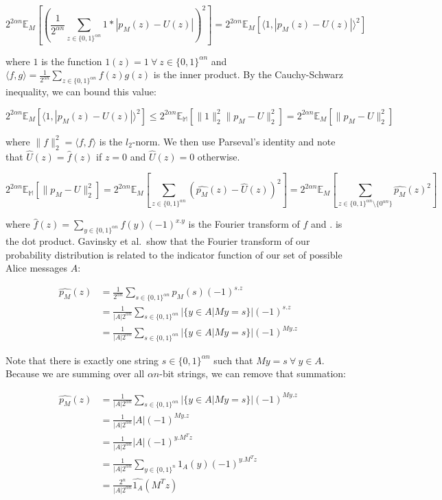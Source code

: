 \documentclass[a4paper]{article}
\begin{document}
        $$2^{2\alpha n}\mathbb{E}_M\left[\left(\frac{1}{2^{\alpha n}}\sum_{z \in \{0, 1\}^{\alpha n}}1 * |p_M(z) - U(z)|\right)^2\right] = 2^{2\alpha n}\mathbb{E}_M[\langle 1, |p_M(z) - U(z)|\rangle^2]$$

        where $1$ is the function $1(z) = 1~\forall~z\in\{0, 1\}^{\alpha n}$ and $\langle f, g\rangle = \frac{1}{2^{\alpha n}}\sum_{z \in \{0, 1\}^{\alpha n}}f(z)g(z)$ is the inner product. By the Cauchy-Schwarz inequality, we can bound this value:

        $$2^{2\alpha n}\mathbb{E}_M[\langle 1, |p_M(z) - U(z)|\rangle^2] \leq 2^{2\alpha n}\mathbb{E_M}[\|1\|_2^2\|p_M - U\|_2^2] = 2^{2\alpha n}\mathbb{E}_M[\|p_M - U\|_2^2]$$

        where $\|f\|_2^2 = \langle f, f\rangle$ is the $l_2$-norm. We then use Parseval's identity and note that $\widehat{U}(z) = \widehat{f}(z)$ if $z = 0$ and $\widehat{U}(z) = 0$ otherwise.

        $$2^{2\alpha n}\mathbb{E_M}[\|p_M - U\|_2^2] = 2^{2\alpha n}\mathbb{E}_M\left[\sum_{z \in \{0, 1\}^{\alpha n}}(\widehat{p_M}(z) - \widehat{U}(z))^2\right] = 2^{2\alpha n}\mathbb{E}_M\left[\sum_{z \in \{0, 1\}^{\alpha n}\setminus\{0^{\alpha n}\}}\widehat{p_M}(z)^2\right]$$

        where $\widehat{f}(z) = \sum_{y \in \{0, 1\}^{\alpha n}}f(y)(-1)^{x.y}$ is the Fourier transform of $f$ and $.$ is the dot product. Gavinsky et al.~show that the Fourier transform of our probability distribution is related to the indicator function of our set of possible Alice messages $A$:

        \begin{align*}
            \widehat{p_M}(z) &= \frac{1}{2^{\alpha n}}\sum_{s \in \{0, 1\}^{\alpha n}}p_M(s)(-1)^{s.z}\\
            &= \frac{1}{|A|2^{\alpha n}}\sum_{s \in \{0, 1\}^{\alpha n}}|\{y \in A|My = s\}|(-1)^{s.z}\\
            &= \frac{1}{|A|2^{\alpha n}}\sum_{s \in \{0, 1\}^{\alpha n}}|\{y \in A|My = s\}|(-1)^{My.z}
        \end{align*}

        Note that there is exactly one string $s \in \{0, 1\}^{\alpha n}$ such that $My = s ~\forall~ y \in A$. Because we are summing over all $\alpha n$-bit strings, we can remove that summation:

        \begin{align*}
            \widehat{p_M}(z) &= \frac{1}{|A|2^{\alpha n}}\sum_{s \in \{0, 1\}^{\alpha n}}|\{y \in A|My = s\}|(-1)^{My.z}\\
            &= \frac{1}{|A|2^{\alpha n}}|A|(-1)^{My.z}\\
            &= \frac{1}{|A|2^{\alpha n}}|A|(-1)^{y.M^Tz}\\
            &= \frac{1}{|A|2^{\alpha n}}\sum_{y \in \{0, 1\}^n}1_A(y)(-1)^{y.M^Tz}\\
            &= \frac{2^n}{|A|2^{\alpha n}}\widehat{1_A}(M^Tz)
        \end{align*}
\end{document}
